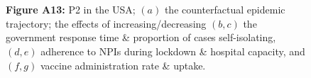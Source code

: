 \documentclass[paper=a4,fontsize=11pt]{article}
\begin{document}
\begin{figure}[!h]
  \\
  \hspace{1.76cm}
  \\
  \caption*{\textbf{Figure A13:} P2 in the USA; $(a)$ the counterfactual epidemic trajectory; the effects of increasing/decreasing $(b,c)$ the government response time \& proportion of cases self-isolating, $(d,e)$ adherence to NPIs during lockdown \& hospital capacity, and $(f,g)$ vaccine administration rate \& uptake.}
\end{figure}
\end{document}
